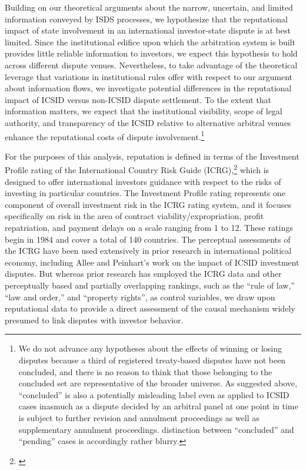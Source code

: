 \documentclass[12pt,onesided]{amsart}
\begin{document}
Building on our theoretical arguments about the narrow, uncertain, and limited information conveyed by ISDS processes, we hypothesize that the reputational impact of state involvement in an international investor-state dispute is at best limited. Since the institutional edifice upon which the arbitration system is built provides little reliable information to investors, we expect this hypothesis to hold across different dispute venues. Nevertheless, to take advantage of the theoretical leverage that variations in institutional rules offer with respect to our argument about information flows, we investigate potential differences in the reputational impact of  ICSID versus  non-ICSID dispute settlement. To the extent that information matters, we expect that the institutional visibility, scope of legal authority, and transparency of the ICSID relative to alternative arbitral venues enhance the reputational costs of dispute involvement.\footnote{We do not advance any hypotheses about the effects of winning or losing disputes because a third of registered treaty-based disputes have not been concluded, and there is no reason to think that those belonging to the concluded set are representative of the broader universe. As suggested above, ``concluded'' is also a potentially misleading label even as applied to ICSID cases inasmuch as a dispute decided by an arbitral panel at one point in time is subject to further revision and annulment proceedings as well as supplementary annulment proceedings. distinction between ``concluded'' and ``pending'' cases is accordingly rather blurry.}

For the purposes of this analysis, reputation is defined in terms of the Investment Profile rating of the International Country Risk Guide (ICRG),\footnote{\citet{prs:2013}} which is designed to offer international investors guidance with respect to the risks of investing in particular countries. The Investment Profile rating represents one component of overall investment risk in the ICRG rating system, and it focuses specifically on risk in the area of contract viability/expropriation, profit repatriation, and payment delays on a scale ranging from 1 to 12. These ratings begin in 1984 and cover a total of 140 countries. The perceptual assessments of the ICRG have been used extensively in prior research in international political economy, including Allee and Peinhart's work on the impact of ICSID investment disputes. But whereas prior research has employed the ICRG data and other perceptually based and partially overlapping rankings, such as the ``rule of law,'' ``law and order,'' and ``property rights'', as control variables, we draw upon reputational data to provide a direct assessment of the causal mechanism widely presumed to link disputes with investor behavior.
\end{document}
